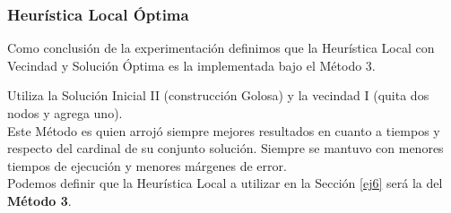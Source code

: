 \newpage

\subsubsection*{Heurística Local Óptima}

Como conclusión de la experimentación definimos que la Heurística Local con Vecindad y Solución Óptima es la implementada bajo el Método 3.

Utiliza la Solución Inicial II (construcción Golosa) y la vecindad I (quita dos nodos y agrega uno).\\

Este Método es quien arrojó siempre mejores resultados en cuanto a tiempos y respecto del cardinal de su conjunto solución. Siempre se mantuvo con menores tiempos de ejecución y menores márgenes de error.\\

Podemos definir que la Heurística Local a utilizar en la Sección \ref{ej6} será la del \textbf{Método 3}.


\newpage